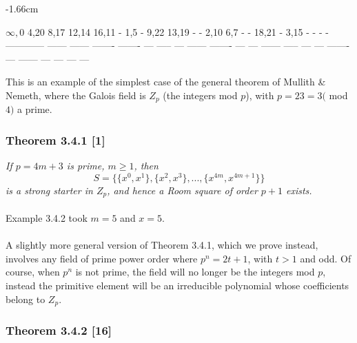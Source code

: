 \documentclass[
  12pt,
  a4paper]{book}
\begin{document}
{-1.66cm}

\(\infty,0\) 4,20 8,17 12,14 16,11 - 1,5 - 9,22 13,19 - - 2,10 6,7 - - 18,21 - 3,15 - - - -
------------ ------ ------ ------- ------- --- ----- --- ------ ------- --- --- ------ ----- --- --- ------- --- ------ --- --- --- ---

This is an example of the simplest case of the general theorem of
Mullith \& Nemeth, where the Galois field is \(Z_p\) (the integers mod
\(p\)), with \(p=23=3(\) mod \(4)\) a prime.\\

\hypertarget{theorem-3.4.1-1}{%
\subsubsection{Theorem 3.4.1 {[}1{]}}\label{theorem-3.4.1-1}}

\emph{If \(p=4m+3\) is prime, \(m \geq 1\), then}
\[S=\{\{x^0,x^1\},\{x^2,x^3\},...,\{x^{4m},x^{4m+1}\}\}\] \emph{is a strong
starter in \(Z_p\), and hence a Room square of order \(p+1\) exists.}\\
~\\
Example 3.4.2 took \(m=5\) and \(x=5\).\\
~\\
A slightly more general version of Theorem 3.4.1, which we prove
instead, involves any field of prime power order where \(p^n=2t+1\), with
\(t>1\) and odd. Of course, when \(p^n\) is not prime, the field will no
longer be the integers mod \(p\), instead the primitive element will be an
irreducible polynomial whose coefficients belong to \(Z_p\).

\hypertarget{theorem-3.4.2-16}{%
\subsubsection{Theorem 3.4.2 {[}16{]}}\label{theorem-3.4.2-16}}
\end{document}
